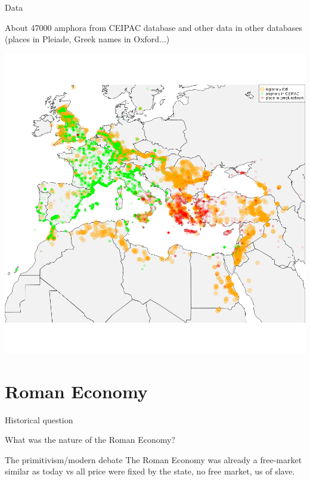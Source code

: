 \documentclass[8pt, handout=show,notes=show]{beamer}
\begin{document}
\begin{frame}{Data}

	About 47000 amphora from CEIPAC database and other data in other databases (places in Pleiade, Greek names in Oxford...)

	\begin{center}
		\includegraphics[width=.9\textwidth]{./fortGreekPlaceAndAmphora.png}
	\end{center}
	
\end{frame}

\section{Roman Economy}
\begin{frame}{Historical question}
	\begin{center}
		\Huge
		What was the nature of the Roman Economy?\\
	\end{center}
	\vfill
	\begin{block}
		{The primitivism/modern debate}
		The Roman Economy was already a free-market similar as today vs all price were fixed by the state, no free market, us of slave.
	\end{block}
\end{frame}
\end{document}
